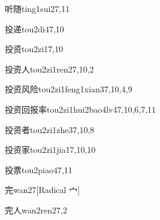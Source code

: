 \begin{verbete}{听随}{ting1sui2}{7,11}
\end{verbete}

\begin{verbete}{投递}{tou2di4}{7,10}
\end{verbete}

\begin{verbete}{投资}{tou2zi1}{7,10}
\end{verbete}

\begin{verbete}{投资人}{tou2zi1ren2}{7,10,2}
\end{verbete}

\begin{verbete}{投资风险}{tou2zi1feng1xian3}{7,10,4,9}
\end{verbete}

\begin{verbete}{投资回报率}{tou2zi1hui2bao4lv4}{7,10,6,7,11}
\end{verbete}

\begin{verbete}{投资者}{tou2zi1zhe3}{7,10,8}
\end{verbete}

\begin{verbete}{投资家}{tou2zi1jia1}{7,10,10}
\end{verbete}

\begin{verbete}{投票}{tou2piao4}{7,11}
\end{verbete}

\begin{verbete}{完}{wan2}{7}[Radical 宀]
\end{verbete}

\begin{verbete}{完人}{wan2ren2}{7,2}
\end{verbete}

